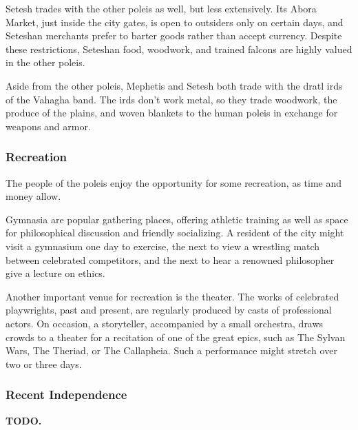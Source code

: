 Setesh trades with the other poleis as well, but less extensively.
Its Abora Market, just inside the city gates, is open to outsiders only on certain days, and Seteshan merchants prefer to barter goods rather than accept currency.
Despite these restrictions, Seteshan food, woodwork, and trained falcons are highly valued in the other poleis.

Aside from the other poleis, Mephetis and Setesh both trade with the dratl irds of the Vahagha band.
The irds don't work metal, so they trade woodwork, the produce of the plains, and woven blankets to the human poleis in exchange for weapons and armor.

\subsubsection{Recreation}
The people of the poleis enjoy the opportunity for some recreation, as time and money allow.

Gymnasia are popular gathering places, offering athletic training as well as space for philosophical discussion and friendly socializing.
A resident of the city might visit a gymnasium one day to exercise, the next to view a wrestling match between celebrated competitors, and the next to hear a renowned philosopher give a lecture on ethics.

Another important venue for recreation is the theater.
The works of celebrated playwrights, past and present, are regularly produced by casts of professional actors.
On occasion, a storyteller, accompanied by a small orchestra, draws crowds to a theater for a recitation of one of the great epics, such as The Sylvan Wars, The Theriad, or The Callapheia.
Such a performance might stretch over two or three days.

\subsubsection{Recent Independence}
\textbf{TODO.}
\newpage
